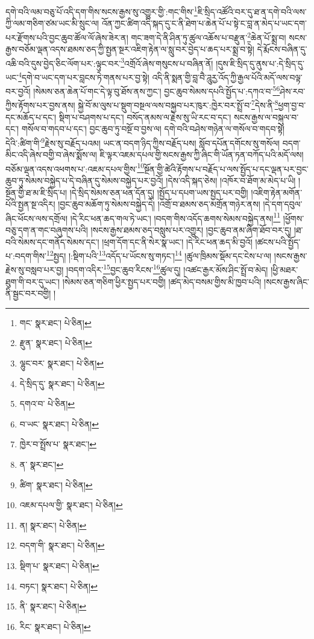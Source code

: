 དགེ་བའི་ལམ་བཅུ་པོ་འདི་དག་གིས་སངས་རྒྱས་སུ་འགྱུར་གྱི་:གང་གིས་\footnote{གང་  སྣར་ཐང་།  པེ་ཅིན། }ཇི་སྲིད་འཚོའི་བར་དུ་ཐ་ན་དགེ་བའི་ལས་ཀྱི་ལམ་གཅིག་ཙམ་ཡང་མི་སྲུང་ལ། འོན་ཀྱང་ཚིག་འདི་སྐད་དུ་ང་ནི་ཐེག་པ་ཆེན་པོ་པ་སྟེ་ང་བླ་ན་མེད་པ་ཡང་དག་པར་རྫོགས་པའི་བྱང་ཆུབ་ཚོལ་ལོ་ཞེས་ཟེར་ན། གང་ཟག་དེ་ནི་ཤིན་ཏུ་ཚུལ་འཆོས་པ་བརྫུན་\footnote{རྫུན་  སྣར་ཐང་།  པེ་ཅིན། }ཆེན་པོ་སྨྲ་བ། སངས་རྒྱས་བཅོམ་ལྡན་འདས་ཐམས་ཅད་ཀྱི་སྤྱན་སྔར་འཇིག་རྟེན་ལ་སླུ་བར་བྱེད་པ་ཆད་པར་སྨྲ་བ་སྟེ། དེ་རྨོངས་བཞིན་དུ་འཆི་བའི་དུས་བྱེད་ཅིང་ལོག་པར་:ལྟུང་བར་\footnote{ལྷུང་བར་  སྣར་ཐང་།  པེ་ཅིན། }འགྲོའོ་ཞེས་གསུངས་པ་བཞིན་ནོ། །དུས་ཇི་སྲིད་དུ་ནུས་པ་:དེ་སྲིད་དུ་ཡང་\footnote{དེ་སྲིད་དུ་  སྣར་ཐང་།  པེ་ཅིན། }དགེ་བ་ཡང་དག་པར་བླངས་ཏེ་གནས་པར་བྱ་སྟེ། འདི་ནི་སྨན་གྱི་བླ་བཻ་ཌཱུརྱ་འོད་ཀྱི་རྒྱལ་པོའི་མདོ་ལས་བལྟ་བར་བྱའོ། །སེམས་ཅན་ཆེན་པོ་གང་དེ་ལྟ་བུ་ཐོས་ནས་ཀྱང་། བྱང་ཆུབ་སེམས་དཔའི་སྤྱོད་པ་:དཀའ་བ་\footnote{དགའ་བ་  པེ་ཅིན། }\footnote{བ་ཡང་  སྣར་ཐང་།  པེ་ཅིན། }ཤེས་རབ་ཀྱིས་རྟོགས་པར་བྱས་ནས། སྐྱེ་བོ་མ་ལུས་པ་སྡུག་བསྔལ་ལས་བསྐྱབ་པར་ཁུར་:ཁྱེར་བར་སྤྲོ་བ་\footnote{ཁྱེར་བ་སྤྲོས་པ་  སྣར་ཐང་། }དེས་ནི་\footnote{ན་  སྣར་ཐང་། }ཕྱག་བྱ་བ་དང་མཆོད་པ་དང་། སྡིག་པ་བཤགས་པ་དང་། བསོད་ནམས་ལ་རྗེས་སུ་ཡི་རང་བ་དང་། སངས་རྒྱས་ལ་བསྐུལ་བ་དང་། གསོལ་བ་གདབ་པ་དང་། བྱང་ཆུབ་ཏུ་བསྔོ་བ་བྱས་ལ། དགེ་བའི་བཤེས་གཉེན་ལ་གསོལ་བ་གདབ་སྟེ། དེའི་:ཚིག་གི་\footnote{ཚིག་  སྣར་ཐང་།  པེ་ཅིན། }རྗེས་སུ་བརྗོད་པའམ། ཡང་ན་བདག་ཉིད་ཀྱིས་བརྗོད་པས། སློབ་དཔོན་དགོངས་སུ་གསོལ། བདག་མིང་འདི་ཞེས་བགྱི་བ་ཞེས་སྨོས་ལ། ཇི་ལྟར་འཇམ་དཔལ་གྱི་སངས་རྒྱས་ཀྱི་ཞིང་གི་ཡོན་ཏན་བཀོད་པའི་མདོ་ལས། བཅོམ་ལྡན་འདས་འཕགས་པ་:འཇམ་དཔལ་གྱིས་\footnote{འཇམ་དཔལ་གྱི་  སྣར་ཐང་།  པེ་ཅིན། }སྔོན་གྱི་ཚེའི་རྟོགས་པ་བརྗོད་པ་ལས་སྤྱོད་པ་དང་ལྡན་པར་བྱང་ཆུབ་ཏུ་སེམས་བསྐྱེད་པ་དེ་བཞིན་དུ་སེམས་བསྐྱེད་པར་བྱའོ། །དེས་འདི་སྐད་ཅེས། །འཁོར་བ་ཐོག་མ་མེད་པ་ཡི། །སྔོན་གྱི་ཐ་མ་ཇི་སྲིད་པ། །དེ་སྲིད་སེམས་ཅན་ཕན་དོན་དུ། །སྤྱོད་པ་དཔག་ཡས་སྤྱད་པར་བགྱི། །འཇིག་རྟེན་མགོན་པོའི་སྤྱན་སྔ་འདིར། །བྱང་ཆུབ་མཆོག་ཏུ་སེམས་བསྐྱེད་དེ། །འགྲོ་བ་ཐམས་ཅད་མགྲོན་གཉེར་ནས། །དེ་དག་དབུལ་ཞིང་ཕོངས་ལས་དགྲོལ། །དེ་རིང་ཕན་ཆད་གལ་ཏེ་ཡང་། །བདག་གིས་འདོད་ཆགས་སེམས་བསྐྱེད་ནས།\footnote{ན།  སྣར་ཐང་།  པེ་ཅིན། } །ཕྱོགས་བཅུ་དག་ན་གང་བཞུགས་པའི། །སངས་རྒྱས་ཐམས་ཅད་བསླུས་པར་འགྱུར། །བྱང་ཆུབ་ནམ་ཞིག་ཐོབ་བར་དུ། །ཐ་བའི་སེམས་དང་གནོད་སེམས་དང་། །ཕྲག་དོག་དང་ནི་སེར་སྣ་ཡང་། །དེ་རིང་ཕན་ཆད་མི་བྱའོ། །ཚངས་པའི་སྤྱོད་པ་:བདག་གིས་\footnote{བདག་གི་  སྣར་ཐང་།  པེ་ཅིན། }སྤྱད། །:སྡིག་པའི་\footnote{སྡིག་པ་  སྣར་ཐང་།  པེ་ཅིན། }འདོད་པ་ཡོངས་སུ་གཏང་།\footnote{བཏང་།  སྣར་ཐང་།  པེ་ཅིན། } །ཚུལ་ཁྲིམས་སྡོམ་དང་ངེས་པ་ལ། །སངས་རྒྱས་རྗེས་སུ་བསླབ་པར་བྱ། །བདག་འདིར་\footnote{ནི་  སྣར་ཐང་།  པེ་ཅིན། }བྱང་ཆུབ་རིངས་\footnote{རིང་  སྣར་ཐང་།  པེ་ཅིན། }ཚུལ་དུ། །འཚང་རྒྱར་མོས་ཤིང་སྤྲོ་བ་མེད། །ཕྱི་མཐར་ཐུག་གི་བར་དུ་ཡང་། །སེམས་ཅན་གཅིག་ཕྱིར་སྤྱད་པར་བགྱི། །ཚད་མེད་བསམ་གྱིས་མི་ཁྱབ་པའི། །སངས་རྒྱས་ཞིང་ནི་སྦྱང་བར་བགྱི། །

